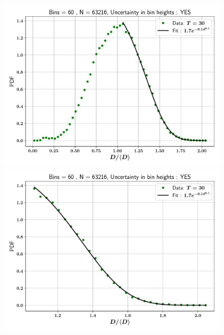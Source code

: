 \begin{figure}
\centering
\includegraphics{plots/drop_stats/linear_tail_fit_uncertainty_yes.pdf} \\
\includegraphics{plots/drop_stats/linear_zoom_tail_fit_uncertainty_yes.pdf} \\ 
\caption{\blindtext}
\label{linear_fits_with}
\end{figure}




